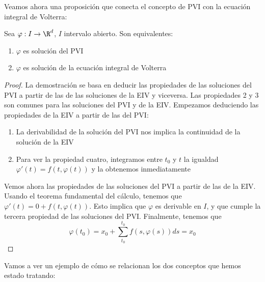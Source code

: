 \documentclass{article}
\begin{document}
Veamos ahora una proposición que conecta el concepto de PVI con la
ecuación integral de Volterra:

\begin{prop}
  Sea $\varphi: I \to \R^d$, $I$ intervalo abierto. Son equivalentes:
  \begin{enumerate}
  \item $\varphi$ es solución del PVI
  \item $\varphi$ es solución de la ecuación integral de Volterra
  \end{enumerate}
\end{prop}

\begin{proof}
  La demostración se basa en deducir las propiedades de las soluciones
  del PVI a partir de las de las soluciones de la EIV y viceversa. Las
  propiedades 2 y 3 son comunes para las soluciones del PVI y de la
  EIV. Empezamos deduciendo las propiedades de la EIV a partir de las
  del PVI:
  \begin{enumerate}
  \item La derivabilidad de la solución del PVI nos implica la
    continuidad de la solución de la EIV
  \item Para ver la propiedad cuatro, integramos entre $t_0$ y $t$ la
    igualdad $\varphi'(t) = f(t, \varphi(t))$ y la obtenemos
    inmediatamente
  \end{enumerate}
  Vemos ahora las propiedades de las soluciones del PVI a partir de
  las de la EIV.  Usando el teorema fundamental del cálculo, tenemos
  que $\varphi'(t) = 0 + f(t, \varphi(t))$.  Esto implica que
  $\varphi$ es derivable en $I$, y que cumple la tercera propiedad de
  las soluciones del PVI. Finalmente, tenemos que
    $$ \varphi(t_0) = x_0 + \sum_{t_0}^{t_0} f(s, \varphi(s))ds = x_0 $$
  \end{proof}

  Vamos a ver un ejemplo de cómo se relacionan los dos conceptos que
  hemos estado tratando:
\end{document}
